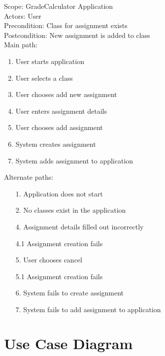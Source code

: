 \documentclass[12pt]{article}
\begin{document}
\noindent
Scope: GradeCalculator Application \\

\noindent
Actors: User \\

\noindent
Precondition: Class for assignment exists \\

\noindent
Postcondition: New assignment is added to class \\

\noindent
Main path:

\begin{enumerate}
	\item User starts application
	\item User selects a class
	\item User chooses add new assignment
	\item User enters assignment details
	\item User chooses add assignment
	\item System creates assignment
	\item System adds assignment to application
\end{enumerate}

\noindent
Alternate paths:
\begin{enumerate}
	\item[1.] Application does not start
	\item[2.] No classes exist in the application
	\item[4.] Assignment details filled out incorrectly
	\item[4.1] Assignment creation fails
	\item[5.] User chooses cancel
	\item[5.1] Assignment creation fails
	\item[6.] System fails to create assignment
	\item[7.] System fails to add assignment to application
\end{enumerate}

\newpage

\section*{Use Case Diagram}
\end{document}
